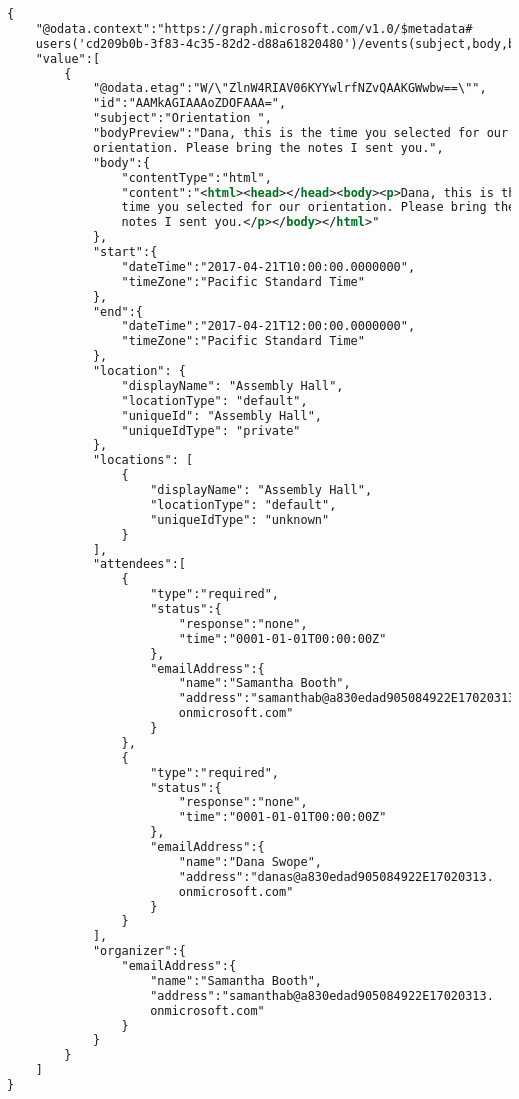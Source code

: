 \begin{description}
\begin{lstlisting}[caption={Contoh respon dari request List events diatas},label={lst:atribute-view},language=xml]
{
    "@odata.context":"https://graph.microsoft.com/v1.0/$metadata#
    users('cd209b0b-3f83-4c35-82d2-d88a61820480')/events(subject,body,bodyPreview,organizer,attendees,start,end,location)",
    "value":[
        {
            "@odata.etag":"W/\"ZlnW4RIAV06KYYwlrfNZvQAAKGWwbw==\"",
            "id":"AAMkAGIAAAoZDOFAAA=",
            "subject":"Orientation ",
            "bodyPreview":"Dana, this is the time you selected for our 
            orientation. Please bring the notes I sent you.",
            "body":{
                "contentType":"html",
                "content":"<html><head></head><body><p>Dana, this is the 
                time you selected for our orientation. Please bring the 
                notes I sent you.</p></body></html>"
            },
            "start":{
                "dateTime":"2017-04-21T10:00:00.0000000",
                "timeZone":"Pacific Standard Time"
            },
            "end":{
                "dateTime":"2017-04-21T12:00:00.0000000",
                "timeZone":"Pacific Standard Time"
            },
            "location": {
                "displayName": "Assembly Hall",
                "locationType": "default",
                "uniqueId": "Assembly Hall",
                "uniqueIdType": "private"
            },
            "locations": [
                {
                    "displayName": "Assembly Hall",
                    "locationType": "default",
                    "uniqueIdType": "unknown"
                }
            ],
            "attendees":[
                {
                    "type":"required",
                    "status":{
                        "response":"none",
                        "time":"0001-01-01T00:00:00Z"
                    },
                    "emailAddress":{
                        "name":"Samantha Booth",
                        "address":"samanthab@a830edad905084922E17020313.
                        onmicrosoft.com"
                    }
                },
                {
                    "type":"required",
                    "status":{
                        "response":"none",
                        "time":"0001-01-01T00:00:00Z"
                    },
                    "emailAddress":{
                        "name":"Dana Swope",
                        "address":"danas@a830edad905084922E17020313.
                        onmicrosoft.com"
                    }
                }
            ],
            "organizer":{
                "emailAddress":{
                    "name":"Samantha Booth",
                    "address":"samanthab@a830edad905084922E17020313.
                    onmicrosoft.com"
                }
            }
        }
    ]
}
\end{lstlisting} 
	
\end{description}



